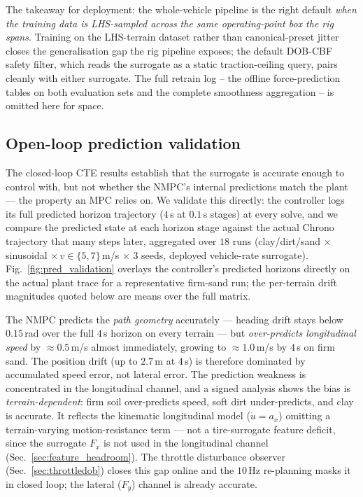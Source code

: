 \documentclass[conference,letterpaper,10pt]{IEEEtran}
\begin{document}
The takeaway for deployment: the whole-vehicle pipeline is the right
default \emph{when the training data is LHS-sampled across the same
operating-point box the rig spans}. Training on the LHS-terrain
dataset rather than canonical-preset jitter closes the
generalisation gap the rig pipeline exposes; the
default DOB-CBF safety filter, which reads the surrogate as a static
traction-ceiling query, pairs cleanly with either surrogate. The full
retrain log -- the offline force-prediction tables on both evaluation
sets and the complete smoothness aggregation -- is omitted here for
space.

\subsection{Open-loop prediction validation}
\label{sec:pred_validation}
The closed-loop CTE results establish that the surrogate is accurate
enough to control with, but not whether the NMPC's internal predictions
match the plant --- the property an MPC relies on. We validate
this directly: the controller logs its full predicted horizon trajectory
($4\,$s at $0.1\,$s stages) at every solve, and we compare the predicted
state at each horizon stage against the actual Chrono trajectory that
many steps later, aggregated over $18$ runs (clay/dirt/sand $\times$
sinusoidal $\times\,v\!\in\!\{5,7\}\,$m/s $\times$ 3 seeds, deployed
vehicle-rate surrogate). Fig.~\ref{fig:pred_validation} overlays the
controller's predicted horizons directly on the actual plant trace for a
representative firm-sand run; the per-terrain drift magnitudes quoted
below are means over the full matrix.

The NMPC predicts the \emph{path geometry} accurately --- heading drift
stays below $0.15\,$rad over the full $4\,$s horizon on every terrain ---
but \emph{over-predicts longitudinal speed} by ${\approx}0.5\,$m/s almost
immediately, growing to ${\approx}1.0\,$m/s by $4\,$s on firm sand. The
position drift (up to $2.7\,$m at $4\,$s) is therefore dominated by
accumulated speed error, not lateral error. The prediction weakness is
concentrated in the longitudinal channel, and a signed analysis shows
the bias is \emph{terrain-dependent}: firm soil over-predicts speed,
soft dirt under-predicts, and clay is accurate. It reflects the
kinematic longitudinal model ($\dot u\!=\!a_x$) omitting a
terrain-varying motion-resistance term --- not a tire-surrogate feature
deficit, since the surrogate $F_x$ is not used in the longitudinal
channel (Sec.~\ref{sec:feature_headroom}). The throttle disturbance
observer (Sec.~\ref{sec:throttledob}) closes this gap online and the
$10\,$Hz re-planning masks it in closed loop; the lateral ($F_y$)
channel is already accurate.
\end{document}

